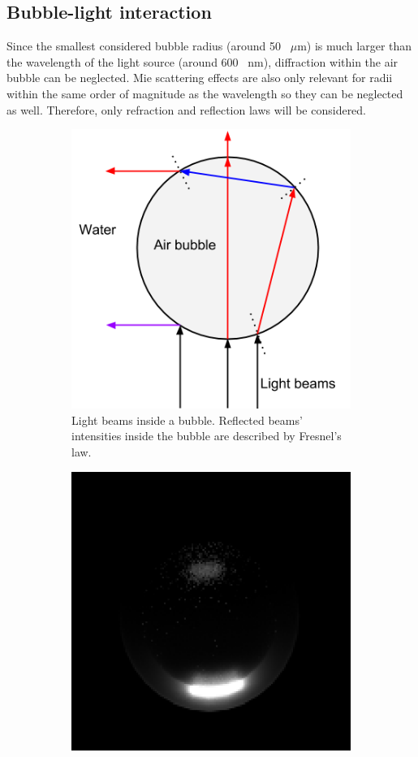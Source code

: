 		\subsection{Bubble-light interaction}
			Since the smallest considered bubble radius (around 50 \, $\mu$m) is much larger than the wavelength of the light source (around 600 \, nm), diffraction within the air bubble can be neglected. Mie scattering effects are also only relevant for radii within the same order of magnitude as the wavelength \citep{Demtroeder2} so they can be neglected as well. Therefore, only refraction and reflection laws will be considered. 
			
			\begin{figure}
		    \centering
		    \begin{subfigure}[t]{0.5\textwidth}
		    		\centering
		        \includegraphics[scale=.5]{images/bubble_refraction.png}
		        \caption{Light beams inside a bubble. Reflected beams' intensities inside the bubble are described by Fresnel's law.}
		        \label{subfig:bubble_refraction}
		    \end{subfigure}%
		    \begin{subfigure}[t]{0.5\textwidth}
		    		\centering
		        \includegraphics[scale=0.6]{images/bubble_simulation.png}

\end{subfigure}
\end{figure}
